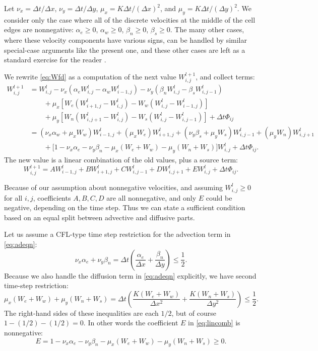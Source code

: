 \documentclass[12pt,final]{amsart}%
\newcommand{\Wlij}{W^l_{i,j}}
\begin{document}
Let $\nu_x = \Delta t/\Delta x$, $\nu_y = \Delta t/\Delta y$, $\mu_x = K \Delta t / (\Delta x)^2$, and $\mu_y = K \Delta t / (\Delta y)^2$.  We consider only the case where all of the discrete velocities at the middle of the cell edges are nonnegative: $\alpha_e\ge 0$, $\alpha_w\ge 0$, $\beta_n\ge 0$, $\beta_s\ge 0$.  The many other cases, where these velocity components have various signs, can be handled by similar special-case arguments like the present one, and these other cases are left as a standard exercise for the reader \citep{MortonMayers}.

We rewrite \eqref{eq:Wfd} as a computation of the next value $W_{i,j}^{l+1}$, and collect terms:
\begin{align*}
 W_{i,j}^{l+1} &= \Wlij - \nu_x \left(\alpha_e \Wlij - \alpha_w W_{i-1,j}^l\right) - \nu_y \left(\beta_n \Wlij - \beta_s W_{i,j-1}^l\right)  \\
      &\qquad + \mu_x \left[W_e \left(W_{i+1,j}^l - \Wlij\right) - W_w \left(\Wlij - W_{i-1,j}^l\right)\right]  \\
      &\qquad + \mu_y \left[W_n \left(W_{i,j+1}^l - \Wlij\right) - W_s \left(\Wlij - W_{i,j-1}^l\right)\right] + \Delta t \Phi_{ij} \\
      &= (\nu_x \alpha_w + \mu_x W_w) W_{i-1,j}^l + (\mu_x W_e) W_{i+1,j}^l + (\nu_y \beta_s + \mu_y W_s) W_{i,j-1}^l + (\mu_y W_n) W_{i,j+1}^l \\
      &\qquad + \Big[1 - \nu_x \alpha_e - \nu_y \beta_n - \mu_x (W_e + W_w) - \mu_y (W_n + W_s)\Big] \Wlij + \Delta t \Phi_{ij}.
\end{align*}
The new value is a linear combination of the old values, plus a source term:
\begin{equation}
W_{i,j}^{l+1} = A W_{i-1,j}^l + B W_{i+1,j}^l + C W_{i,j-1}^l + D W_{i,j+1}^l + E \Wlij + \Delta t \Phi_{ij}. \label{eq:lincomb}
\end{equation}

Because of our assumption about nonnegative velocities, and assuming $\Wlij \ge 0$ for all $i,j$, coefficients $A,B,C,D$ are all nonnegative, and only $E$ could be negative, depending on the time step.  Thus we can state a sufficient condition based on an equal split between advective and diffusive parts.

Let us assume a CFL-type time step restriction for the advection term in  \eqref{eq:adeqn}:
\begin{equation}
\nu_x \alpha_e + \nu_y \beta_n = \Delta t \left(\frac{\alpha_e}{\Delta x} + \frac{\beta_n}{\Delta y}\right) \le \frac{1}{2}. \label{eq:adstabcond}
\end{equation}
Because we also handle the diffusion term in \eqref{eq:adeqn} explicitly, we have second time-step restriction:
\begin{equation}
\mu_x (W_e + W_w) + \mu_y (W_n + W_s) = \Delta t \left(\frac{K(W_e + W_w)}{\Delta x^2} + \frac{K(W_n + W_s)}{\Delta y^2}\right) \le \frac{1}{2}. \label{eq:diffstabcond}
\end{equation}
The right-hand sides of these inequalities are each $1/2$, but of course $1-(1/2)-(1/2)=0$.  In other words the coefficient $E$ in \eqref{eq:lincomb} is nonnegative:
	$$E = 1 - \nu_x \alpha_e - \nu_y \beta_n - \mu_x (W_e + W_w) - \mu_y (W_n + W_s) \ge 0.$$
\end{document}
